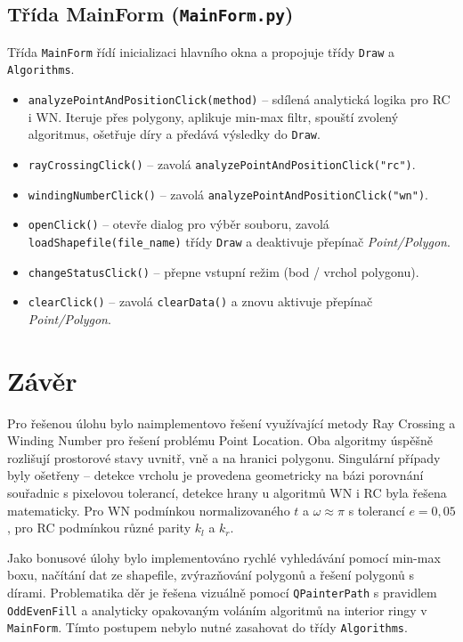 \documentclass[11pt, a4paper]{article}
\begin{document}
\newpage
\subsection{Třída MainForm (\texttt{MainForm.py})}
Třída \texttt{MainForm} řídí inicializaci hlavního okna a propojuje třídy \texttt{Draw} a \texttt{Algorithms}.

\begin{itemize}
\item \texttt{analyzePointAndPositionClick(method)} -- sdílená analytická logika pro RC i WN. Iteruje přes polygony, aplikuje min-max filtr, spouští zvolený algoritmus, ošetřuje díry a předává výsledky do \texttt{Draw}.
\item \texttt{rayCrossingClick()} -- zavolá \texttt{analyzePointAndPositionClick("rc")}.
\item \texttt{windingNumberClick()} -- zavolá \texttt{analyzePointAndPositionClick("wn")}.
\item \texttt{openClick()} -- otevře dialog pro výběr souboru, zavolá \texttt{loadShapefile(file\_name)} třídy \texttt{Draw} a deaktivuje přepínač \textit{Point/Polygon}.
\item \texttt{changeStatusClick()} -- přepne vstupní režim (bod / vrchol polygonu).
\item \texttt{clearClick()} -- zavolá \texttt{clearData()} a znovu aktivuje přepínač \textit{Point/Polygon}.
\end{itemize}

\section{Závěr}
Pro řešenou úlohu bylo naimplementovo řešení využívající metody Ray Crossing a Winding Number pro řešení problému Point Location. Oba algoritmy úspěšně rozlišují prostorové stavy uvnitř, vně a na hranici polygonu. Singulární případy byly ošetřeny -- detekce vrcholu je provedena geometricky na bázi porovnání souřadnic s pixelovou tolerancí, detekce hrany u algoritmů WN i RC byla řešena matematicky. Pro WN podmínkou normalizovaného $t$ a $\omega \approx \pi$ s tolerancí $e = 0{,}05$, pro RC podmínkou různé parity $k_l$ a $k_r$.

Jako bonusové úlohy bylo implementováno rychlé vyhledávání pomocí min-max boxu, načítání dat ze shapefile, zvýrazňování polygonů a řešení polygonů s dírami. Problematika děr je řešena vizuálně pomocí \texttt{QPainterPath} s pravidlem \texttt{OddEvenFill} a analyticky opakovaným voláním algoritmů na interior ringy v \texttt{MainForm}. Tímto postupem nebylo nutné zasahovat do třídy \texttt{Algorithms}.
\end{document}
